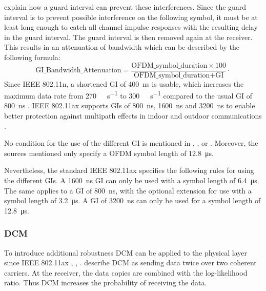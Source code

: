 \textcite{pulimamidi_development_2007} explain how a guard interval can prevent these interferences.
Since the guard interval is to prevent possible interference on the following symbol, it must be at least long enough to catch all channel impulse responses with the resulting delay in the guard interval.
The guard interval is then removed again at the receiver.
This results in an attenuation of bandwidth which can be described
by the following formula:
\begin{equation}\label{eq:GI}
   \text{GI\_Bandwidth\_Attenuation} =
   \frac{
      \text{OFDM\_symbol\_duration} \times 100
   }{
      \text{OFDM\_symbol\_duration} + \text{GI}
   }
   \cdot
\end{equation}
Since IEEE 802.11n, a shortened \ac{GI} of \SI{400}{\nano\second} is usable, which increases the
maximum data rate from \SI{270}{\mega\bit\per\second} to \SI{300}{\mega\bit\per\second} compared to
the usual \ac{GI} of \SI{800}{\nano\second} \cite{sauter_wireless_2022}.
IEEE 802.11ax supports \ac{GI}s of \SI{800}{\nano\second}, \SI{1600}{\nano\second} and \SI{3200}{\nano\second} to
enable better protection against multipath effects in indoor and outdoor communications \cite{deng_ieee_2017}.

No condition for the use of the different \ac{GI} is mentioned in \cite{deng_ieee_2017}, \cite{rochim_performance_2020} , \cite{mozaffariahrar_survey_2022} or \cite{afaqui_ieee_2017}.
Moreover, the sources mentioned only specify a \ac{OFDM} symbol length of \SI{12.8}{\micro\second}.

Nevertheless, the standard IEEE 802.11ax \cite{noauthor_ieee_2021} specifies the following rules for using the different \ac{GI}s.
A \SI{1600}{\nano\second} \ac{GI} can only be used with a symbol length of \SI{6.4}{\micro\second}.
The same applies to a \ac{GI} of \SI{800}{\nano\second}, with the optional extension for use with a symbol length of \SI{3.2}{\micro\second}.
A \ac{GI} of \SI{3200}{\nano\second} can only be used for a symbol length of \SI{12.8}{\micro\second}.
\subsubsection*{\acf{DCM}}
To introduce additional robustness \ac{DCM} can be applied to the physical layer since
IEEE 802.11ax \cite{jacob_system-level_2020}, \cite{triwinarko_phy_2021}, \cite{noauthor_ieee_2021}.
\textcite{jacob_system-level_2020} describe \ac{DCM} as sending data twice over two coherent carriers.
At the receiver, the data copies are combined with the log-likelihood ratio.
Thus \ac{DCM} increases the probability of receiving the data.

